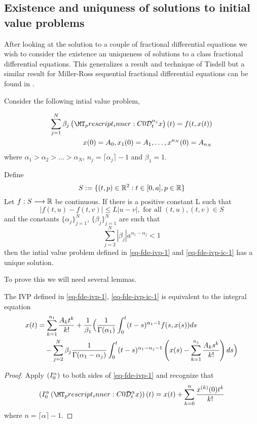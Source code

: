 \subsection{Existence and uniquness of solutions to initial value problems}
\label{sec:existence_uniq}
After looking at the solution to a couple of fractional differential equations 
we wish to consider the existence an uniqueness of solutions to a class fractional differential equations. 
This generalizes a result and technique of Tisdell \cite{Tisdell2012} but a similar result for Miller-Ross sequential
fractional differential equations can be found in \cite{Podlubny1999}.


\begin{theorem}[Uniqueness]
\label{thm-existence-uniq}
Consider the following intial value problem,

	\begin{align}
		\label{eq-fde-ivp-1}
		\sum_{j=1}^{N} \beta_j\capder{0}{t}{\alpha_j}{x}(t) = f(t,x(t)) \\
		\label{eq-fde-ivp-ic-1}
		x(0) = A_0, x_1(0) = A_1, \ldots, x^{n_N}(0) = A_{n_N}
	\end{align}
	where $ \alpha_1 > \alpha_2 > \ldots > \alpha_N $, 
	$ n_j = \lceil \alpha_j \rceil - 1 $ and $ \beta_1 = 1 $.
	
	Define
		$$ S:= \{ (t,p) \in \mathbb{R}^2 : t \in [0, a], p \in \mathbb{R} \} $$
	Let $ f : S \longrightarrow \mathbb{R} $ be continuous. If there is a positive constant L such that 
		$$ |f(t,u) - f(t,v)| \leq L|u-v|, \text{ for all } (t,u), (t,v) \in S $$
	and the constants $ \{ \alpha_j \}_{j = 1}^{N} $, $ \{ \beta_j \}_{j=1}^N $
	are such that
	$$
		\sum_{j=2}^N \left|\beta_j\right| a^{\alpha_1 - \alpha_j} < 1
	$$
	then the intial value problem defined in \ref{eq-fde-ivp-1} and \ref{eq-fde-ivp-ic-1} has a unique solution.
\end{theorem}
To prove this we will need several lemmas. 

\begin{lemma}
	The IVP defined in \eqref{eq-fde-ivp-1}, \eqref{eq-fde-ivp-ic-1} is equivalent to the integral equation
	\begin{align}
		x(t) &= \sum_{k=1}^{n_1}\frac{A_kt^k}{k!} + \frac{1}{\beta_1} \Bigl( \frac{1}{\Gamma(\alpha_1)}\int_{0}^{t} (t-s)^{\alpha_1 - 1}f(s,x(s))ds \\
			& \ \ \ - \sum_{j=2}^{N}\beta_j \frac{1}{\Gamma(\alpha_1 - \alpha_j)}
			\int_{0}^{t}(t-s)^{\alpha_1 - \alpha_j - 1}\left(x(s) - \sum_{k=1}^{n_j}\frac{A_ks^k}{k!} \right) ds \Bigr)
	\end{align}
\end{lemma}
\begin{proof}
	Apply $ \left( I_{0}^{\alpha}  \right) $ to both sides of \eqref{eq-fde-ivp-1} and recognize that
	$$
		\rli{0}{\alpha}{\capder{0}{t}{\alpha}{x}}(t) = x(t) + \sum_{k=0}^{n} \frac{x^{(k)}(0)t^{k}}{k!}
	$$
	where $ n = \lceil \alpha \rceil - 1 $.
\end{proof}


